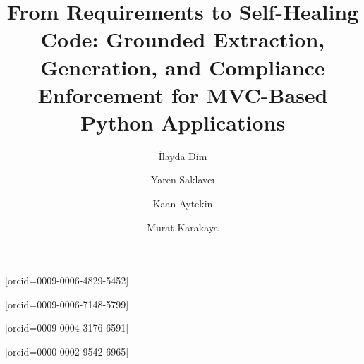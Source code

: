 \documentclass[a4paper,fleqn]{cas-sc}
\begin{document}
\def\floatpagepagefraction{1}
\def\textpagefraction{.001}
\let\WriteBookmarks\relax
\renewcommand\floatpagefraction{.85}
\renewcommand\topfraction{.85}
\renewcommand\bottomfraction{.9}
\renewcommand\textfraction{.1}
\setcounter{totalnumber}{4}
\setcounter{topnumber}{3}
\setcounter{bottomnumber}{1}


\title[mode=title]{From Requirements to Self-Healing Code: Grounded Extraction, Generation, and Compliance Enforcement for MVC-Based Python Applications}
\author[1]{{\.{I}}layda Dim}[orcid=0009-0006-4829-5452]

\author[1]{Yaren Saklavc\i}[orcid=0009-0006-7148-5799]

\author[1]{Kaan Aytekin}[orcid=0009-0004-3176-6591]

\author[1]{Murat Karakaya}[orcid=0000-0002-9542-6965]
\cormark[1] 


\end{document}
